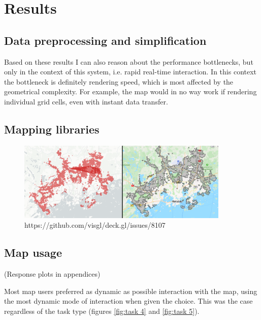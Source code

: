 \section{Results}

\subsection{Data preprocessing and simplification}



Based on these results
I can also reason about the performance bottlenecks,
but only in the context of this system, i.e. rapid real-time interaction.
In this context the bottleneck is definitely rendering speed,
which is most affected by the geometrical complexity.
For example, the map would in no way work if rendering individual grid cells,
even with instant data transfer.

\subsection{Mapping libraries}



\begin{figure}[H]
	\centering
	\includegraphics[width=0.9\textwidth]{visual/figures/bug.png}
	\caption{https://github.com/visgl/deck.gl/issues/8107}
	\label{fig:bug}
\end{figure}

\subsection{Map usage}

(Response plots in appendices)

Most map users preferred as dynamic as possible interaction with the map,
using the most dynamic mode of interaction when given the choice.
This was the case regardless of the task type (figures \ref{fig:task 4} and \ref{fig:task 5}).

